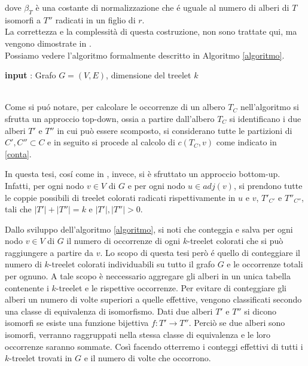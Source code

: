 dove $ \beta_T $ \`e una costante di normalizzazione che \'e uguale al numero di alberi di $ T $ isomorfi a $ T'' $ radicati in un figlio di $ r $.\\
 La correttezza e la complessit\`a di questa costruzione, non sono trattate qui, ma vengono dimostrate in \cite{alon1995color}.\\
 Possiamo vedere l'algoritmo formalmente  descritto in Algoritmo \ref{algoritmo}.\mbox{}\\


\begin{algorithm}[H]
	\label{algoritmo}
	\SetAlgoLined
	\caption{Fase di costruzione}
 	\textbf{input} : Grafo $ G =(V,E) $, dimensione del treelet $ k $ \;	
 			
\end{algorithm}\mbox{}\\

Come si pu\'o notare, per calcolare le occorrenze di un albero $ T_C $ nell'algoritmo si sfrutta un approccio top-down, ossia a partire dall'albero $ T_C $ si identificano i due alberi $ T' $ e $ T'' $ in cui pu\`o essere scomposto, si considerano tutte le partizioni di $ C',C'' \subset C $ e in seguito si procede al calcolo di $ c(T_C,v) $ come indicato in \eqref{conta}.

In questa tesi, cos\'i come in \cite{bressan2019motivo}, invece, si \`e sfruttato un approccio bottom-up. Infatti, per ogni nodo $ v \in V $ di $ G $ e per ogni nodo $ u \in adj(v)$, si prendono tutte le coppie possibili di treelet colorati radicati rispettivamente in $ u $ e $ v $, $ T'_{C'} $ e $ T''_{C''} $, tali che $ |T'| + |T''| = k $ e $ |T'|,|T''|>0 $.

Dallo sviluppo dell'algoritmo \ref{algoritmo}, si noti che conteggia e salva per ogni nodo $ v\in V $ di $ G $ il numero di occorrenze di ogni $ k $-treelet colorati che si pu\`o raggiungere a partire da $ v $.
Lo scopo di questa tesi per\`o \'e quello di conteggiare il numero di $ k $-treelet colorati individuabili su tutto il grafo $ G $ e le occorrenze totali per ognuno.
A tale scopo \`e neccessario aggregare gli alberi in un unica tabella contenente i $ k $-treelet e le rispettive occorrenze.
Per evitare di conteggiare gli alberi un numero di volte superiori a quelle effettive, vengono classificati secondo una classe di equivalenza di isomorfismo. Dati due alberi $ T' $ e $ T'' $ si dicono isomorfi se esiste una funzione bijettiva $ f : T' \rightarrow T'' $.
Perci\`o se due alberi sono isomorfi, verranno raggruppati nella stessa classe di equivalenza e le loro occorrenze saranno sommate.
Cos\`i facendo otterremo i conteggi effettivi di tutti i $ k $-treelet trovati in $ G $ e il numero di volte che occorrono. 


